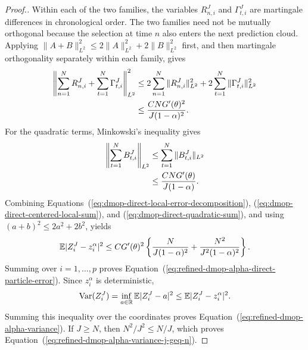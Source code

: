 \documentclass[11pt]{article}
\theoremstyle{thmstylethree}%
\begin{document}
\begin{proof}[Proof.]
Within each of the two families, the variables $R_{n,i}^J$ and
$\Gamma_{t,i}^J$ are martingale differences in chronological order.
The two families need not be mutually orthogonal because the selection
at time $n$ also enters the next prediction cloud.  Applying
$\|A+B\|_{L^2}^2\leq2\|A\|_{L^2}^2+2\|B\|_{L^2}^2$ first, and then
martingale orthogonality separately within each family, gives
\begin{align}
\left\|
\sum_{n=1}^{N}R_{n,i}^J
+\sum_{t=1}^{N}\Gamma_{t,i}^J
\right\|_{L^2}^2
&\leq
2\sum_{n=1}^{N}\|R_{n,i}^J\|_{L^2}^2
+2\sum_{t=1}^{N}\|\Gamma_{t,i}^J\|_{L^2}^2               \notag\\
&\leq
\frac{CNG'(\theta)^2}{J(1-\alpha)^2}.
\label{eq:dmop-direct-centered-local-sum}
\end{align}
For the quadratic terms, Minkowski's inequality gives
\begin{align}
\left\|\sum_{t=1}^{N}B_{t,i}^J\right\|_{L^2}
&\leq
\sum_{t=1}^{N}\|B_{t,i}^J\|_{L^2}                         \notag\\
&\leq
\frac{CNG'(\theta)}{J(1-\alpha)}.
\label{eq:dmop-direct-quadratic-sum}
\end{align}
Combining Equations~(\ref{eq:dmop-direct-local-error-decomposition}),
(\ref{eq:dmop-direct-centered-local-sum}), and
(\ref{eq:dmop-direct-quadratic-sum}), and using
$(a+b)^2\leq2a^2+2b^2$, yields
\begin{equation}
\mathbb{E}|Z_i^J-z_i^\alpha|^2
\leq
CG'(\theta)^2
\left\{
\frac{N}{J(1-\alpha)^2}
+\frac{N^2}{J^2(1-\alpha)^2}
\right\}.
\label{eq:dmop-direct-coordinate-particle-error}
\end{equation}
Summing over $i=1,\ldots,p$ proves
Equation~(\ref{eq:refined-dmop-alpha-direct-particle-error}).  Since
$z_i^\alpha$ is deterministic,
\begin{equation}
\mathrm{Var}(Z_i^J)
=\inf_{a\in\mathbb R}\mathbb{E}|Z_i^J-a|^2
\leq\mathbb{E}|Z_i^J-z_i^\alpha|^2.
\end{equation}
Summing this inequality over the coordinates proves
Equation~(\ref{eq:refined-dmop-alpha-variance}).  If $J\geq N$, then
$N^2/J^2\leq N/J$, which proves
Equation~(\ref{eq:refined-dmop-alpha-variance-j-geq-n}).
\end{proof}
\end{document}
